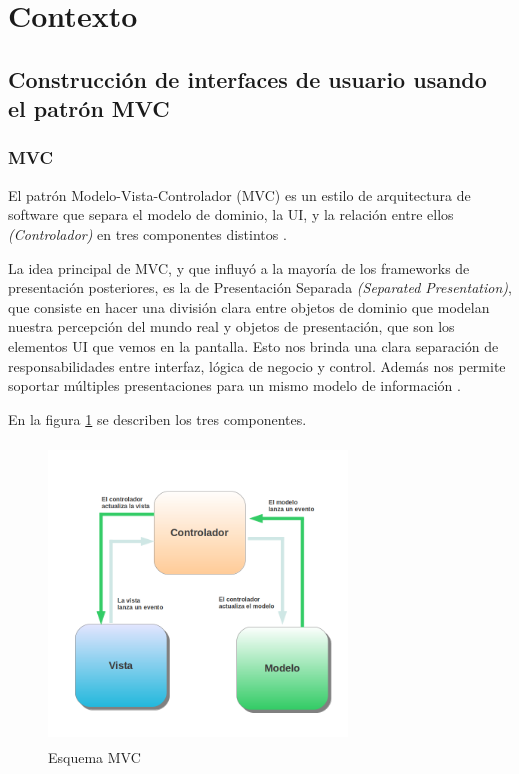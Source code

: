 \section{Contexto}
\subsection{Construcción de interfaces de usuario usando el patrón MVC}

	\subsubsection{MVC}
	El patrón Modelo-Vista-Controlador (MVC) es un estilo de arquitectura de
	software que separa el modelo de dominio, la UI,
	y la relación entre ellos \emph{(Controlador)} en tres componentes distintos
	\cite{burbeck87}.
	
	La idea principal de MVC, y que influyó a la mayoría de los frameworks de
	presentación posteriores, es la de Presentación Separada \emph{(Separated
	Presentation)}, que consiste en hacer una división clara entre objetos de 
	dominio que modelan nuestra percepción del mundo real y objetos de presentación, 
	que son los elementos UI que vemos en la pantalla. 
	Esto nos brinda una clara separación de responsabilidades entre interfaz,
	lógica de negocio y control. Además nos permite soportar múltiples
	presentaciones para un mismo modelo de información \cite{reenskaug79}.
	\bigskip
	
	En la figura \ref{mvc} se describen los tres componentes.  
	
	\begin{figure}[h]
		\centering
		\includegraphics[width=300px, height=300px]{img/mvc} 
		\caption{Esquema MVC}
		\label{mvc}
	\end{figure}  
	
